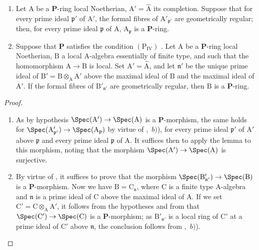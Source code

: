 \begin{corollary}[7.4.3]
\label{IV.7.4.3}
\begin{enumerate}[label=\emph{\roman*)}]
  \item Let $\mathrm{A}$ be a $\boldsymbol{P}$-ring local Noetherian, $\mathrm{A}'=\widehat{\mathrm{A}}$ its completion.
  Suppose that for every prime ideal $\mathfrak{p}'$ of $\mathrm{A}'$, the formal fibres of $\mathrm{A}'_{\mathfrak{p}'}$ are geometrically regular; then, for every prime ideal $\mathfrak{p}$ of $\mathrm{A}$, $\mathrm{A}_\mathfrak{p}$ is a $\boldsymbol{P}$-ring.

  \item Suppose that $\boldsymbol{P}$ satisfies the condition $(\mathrm{P_{IV}})$ .
  Let $\mathrm{A}$ be a $\boldsymbol{P}$-ring local Noetherian, $\mathrm{B}$ a local A-algebra essentially of finite type, and such that the homomorphism $\mathrm{A}\to\mathrm{B}$ is local.
  Set $\mathrm{A}'=\widehat{\mathrm{A}}$, and let $\mathfrak{n}'$ be the unique prime ideal of $\mathrm{B}'=\mathrm{B}\otimes_\mathrm{A}\mathrm{A}'$ above the maximal ideal of $\mathrm{B}$ and the maximal ideal of $\mathrm{A}'$.
  If the formal fibres of $\mathrm{B}'_{\mathfrak{n}'}$ are geometrically regular, then $\mathrm{B}$ is a $\boldsymbol{P}$-ring.
\end{enumerate}
\end{corollary}

\begin{proof}
\begin{enumerate}[label=(\roman*)]
  \item As by hypothesis $\Spec(\mathrm{A}')\to\Spec(\mathrm{A})$ is a $\boldsymbol{P}$-morphism, the same holds for $\Spec(\mathrm{A}'_{\mathfrak{p}'})\to\Spec(\mathrm{A}_\mathfrak{p})$ by virtue of ,~$b)$), for every prime ideal $\mathfrak{p}'$ of $\mathrm{A}'$ above $\mathfrak{p}$ and every prime ideal $\mathfrak{p}$ of $\mathrm{A}$.
  It suffices then to apply the lemma  to this morphism, noting that the morphism $\Spec(\mathrm{A}')\to\Spec(\mathrm{A})$ is surjective.

  \item By virtue of , it suffices to prove that the morphism $\Spec(\mathrm{B}'_{\mathfrak{n}'})\to\Spec(\mathrm{B})$ is a $\boldsymbol{P}$-morphism.
  Now we have $\mathrm{B}=\mathrm{C}_\mathfrak{n}$, where $\mathrm{C}$ is a finite type A-algebra and $\mathfrak{n}$ is a prime ideal of $\mathrm{C}$ above the maximal ideal of $\mathrm{A}$.
  If we set $\mathrm{C}'=\mathrm{C}\otimes_\mathrm{A}\mathrm{A}'$, it follows from the hypotheses and from  that $\Spec(\mathrm{C}')\to\Spec(\mathrm{C})$ is a $\boldsymbol{P}$-morphism; as $\mathrm{B}'_{\mathfrak{n}'}$ is a local ring of $\mathrm{C}'$ at a prime ideal of $\mathrm{C}'$ above $\mathfrak{n}$, the conclusion follows from ,~$b)$).
\end{enumerate}
\end{proof}

